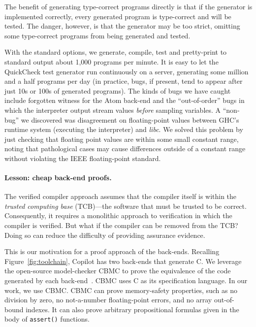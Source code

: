 \documentclass[9pt]{sigplanconf}
\begin{document}
The benefit of generating type-correct programs directly is that if the
generator is implemented correctly, every generated program is type-correct and
will be tested.  The danger, however, is that the generator may be too strict,
omitting some type-correct programs from being generated and tested.

With the standard options, we generate, compile, test and pretty-print to
standard output about 1,000 programs per minute.  It is easy to let the
QuickCheck test generator run continuously on a server, generating some million
and a half programs per day (in practice, bugs, if present, tend to appear after
just 10s or 100s of generated programs).  The kinds of bugs we have caught
include forgotten witness for the Atom back-end and the ``out-of-order'' bugs in
which the interpreter output stream values \emph{before} sampling variables.  A
``non-bug'' we discovered was disagreement on floating-point values between
GHC's runtime system (executing the interpreter) and \emph{libc}.  We solved
this problem by just checking that floating point values are within some small
constant range, noting that pathological cases may cause differences outside of
a constant range without violating the IEEE floating-point standard.

\paragraph{Lesson: cheap back-end proofs.}
The verified compiler approach assumes that the compiler itself is within the
\emph{trusted computing base} (TCB)---the software that must be trusted to be
correct.  Consequently, it requires a monolithic approach to verification in
which the compiler is verified.  But what if the compiler can be removed from
the TCB?  Doing so can reduce the difficulty of providing assurance evidence.

This is our motivation for a proof approach of the back-ends.  Recalling
Figure~\ref{fig:toolchain}, Copilot has two back-ends that generate C.  We
leverage the open-source model-checker CBMC to prove the equivalence of the code generated by each
back-end~\cite{cbmc}.  CBMC uses C as its
specification language.  In our work, we use CBMC.  CBMC can prove memory-safety
properties, such as no division by zero, no not-a-number floating-point errors,
and no array out-of-bound indexes.  It can also prove arbitrary propositional
formulas given in the body of {\tt assert()} functions.
\end{document}

